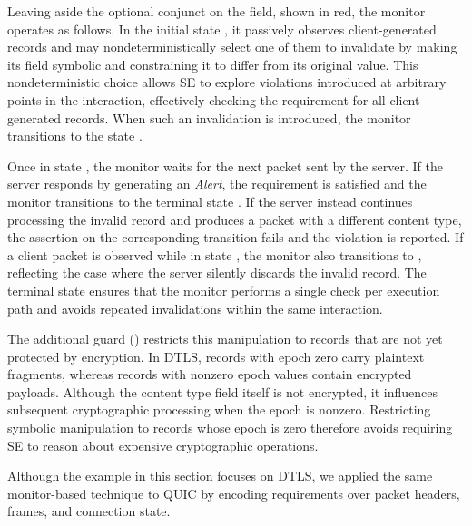 Leaving aside the optional conjunct on the  field, shown in red, the monitor operates as follows.
In the initial state , it passively observes client-generated records and may nondeterministically select one of them to invalidate by making its  field symbolic and constraining it to differ from its original value.
This nondeterministic choice allows SE to explore violations introduced at arbitrary points in the interaction, effectively checking the requirement for all client-generated records. 
When such an invalidation is introduced, the monitor transitions to the state .

Once in state , the monitor waits for the next packet sent by the server.
If the server responds by generating an \emph{Alert}, the requirement is satisfied and the monitor transitions to the terminal state .
If the server instead continues processing the invalid record and produces a packet with a different content type, the assertion on the corresponding transition fails and the violation is reported.
If a client packet is observed while in state , the monitor also transitions to , reflecting the case where the server silently discards the invalid record.
The terminal state  ensures that the monitor performs a single check per execution path and avoids repeated invalidations within the same interaction.
 
The additional guard () restricts this manipulation to records that are not yet protected by encryption.
In DTLS, records with epoch zero carry plaintext fragments, whereas records with nonzero epoch values contain encrypted payloads.
Although the content type field itself is not encrypted, it influences subsequent cryptographic processing when the epoch is nonzero.
Restricting symbolic manipulation to records whose epoch is zero therefore avoids requiring SE to reason about expensive cryptographic operations.

Although the example in this section focuses on DTLS, we applied the same monitor-based technique to QUIC by encoding requirements over packet headers, frames, and connection state.

